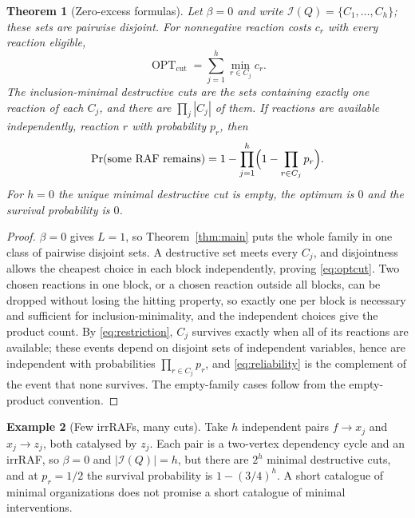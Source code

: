\documentclass[11pt,a4paper]{article}
\theoremstyle{plain}
\newtheorem{theorem}{Theorem}[section]
\theoremstyle{definition}
\newtheorem{example}[theorem]{Example}
\theoremstyle{remark}
\newcommand{\Irr}{\mathcal I}
\newcommand{\OPT}{\operatorname{OPT}}
\begin{document}
\begin{theorem}[Zero-excess formulas]\label{thm:zero}
Let $\beta=0$ and write $\Irr(Q)=\{C_1,\ldots,C_h\}$; these sets are pairwise disjoint. For nonnegative reaction costs $c_r$ with every reaction eligible,
\begin{equation}\label{eq:optcut}
 \OPT_{\mathrm{cut}}=\sum_{j=1}^{h}\min_{r\in C_j}c_r .
\end{equation}
The inclusion-minimal destructive cuts are the sets containing exactly one reaction of each $C_j$, and there are $\prod_j|C_j|$ of them. If reactions are available independently, reaction $r$ with probability $p_r$, then
\begin{equation}\label{eq:reliability}
 \Pr(\text{some RAF remains})=1-\prod_{j=1}^{h}\Bigl(1-\prod_{r\in C_j}p_r\Bigr).
\end{equation}
For $h=0$ the unique minimal destructive cut is empty, the optimum is $0$ and the survival probability is $0$.
\end{theorem}
\begin{proof}
$\beta=0$ gives $L=1$, so Theorem~\ref{thm:main} puts the whole family in one class of pairwise disjoint sets. A destructive set meets every $C_j$, and disjointness allows the cheapest choice in each block independently, proving \eqref{eq:optcut}. Two chosen reactions in one block, or a chosen reaction outside all blocks, can be dropped without losing the hitting property, so exactly one per block is necessary and sufficient for inclusion-minimality, and the independent choices give the product count. By \eqref{eq:restriction}, $C_j$ survives exactly when all of its reactions are available; these events depend on disjoint sets of independent variables, hence are independent with probabilities $\prod_{r\in C_j}p_r$, and \eqref{eq:reliability} is the complement of the event that none survives. The empty-family cases follow from the empty-product convention.
\end{proof}

\begin{example}[Few irrRAFs, many cuts]\label{ex:twocycle}
Take $h$ independent pairs $f\to x_j$ and $x_j\to z_j$, both catalysed by $z_j$. Each pair is a two-vertex dependency cycle and an irrRAF, so $\beta=0$ and $|\Irr(Q)|=h$, but there are $2^h$ minimal destructive cuts, and at $p_r=1/2$ the survival probability is $1-(3/4)^h$. A short catalogue of minimal organizations does not promise a short catalogue of minimal interventions.
\end{example}
\end{document}
